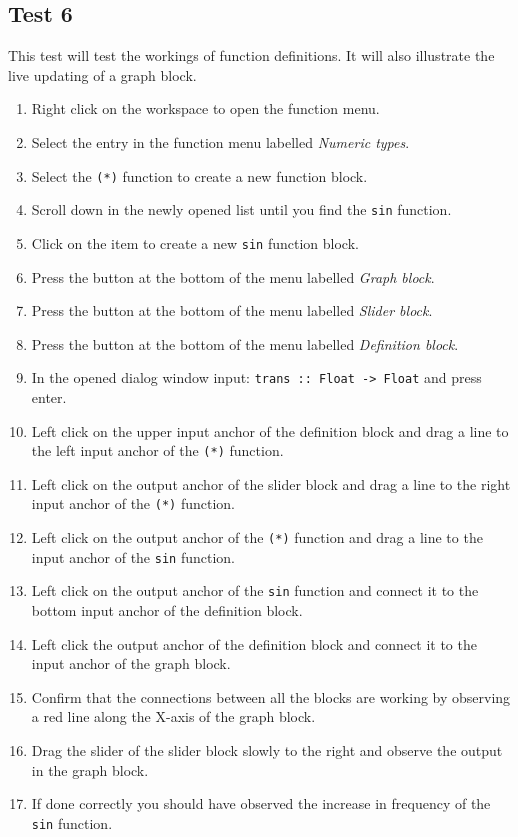 	\subsection{Test 6}
		This test will test the workings of function definitions. It will also illustrate the live updating of a graph block.

		\begin{enumerate}
			\item Right click on the workspace to open the function menu.
			\item Select the entry in the function menu labelled \emph{Numeric types}.
			\item Select the \texttt{(*)} function to create a new function block.
			\item Scroll down in the newly opened list until you find the \texttt{sin} function.
			\item Click on the item to create a new \texttt{sin} function block.
			\item Press the button at the bottom of the menu labelled \emph{Graph block}.
			\item Press the button at the bottom of the menu labelled \emph{Slider block}.
			\item Press the button at the bottom of the menu labelled \emph{Definition block}.
			\item In the opened dialog window input: \texttt{trans :: Float -> Float} and press enter.
			\item Left click on the upper input anchor of the definition block and drag a line to the left input anchor of the \texttt{(*)} function.
			\item Left click on the output anchor of the slider block and drag a line to the right input anchor of the \texttt{(*)} function.
			\item Left click on the output anchor of the \texttt{(*)} function and drag a line to the input anchor of the \texttt{sin} function.
			\item Left click on the output anchor of the \texttt{sin} function and connect it to the bottom input anchor of the definition block.
			\item Left click the output anchor of the definition block and connect it to the input anchor of the graph block.
			\item Confirm that the connections between all the blocks are working by observing a red line along the X-axis of the graph block.
			\item Drag the slider of the slider block slowly to the right and observe the output in the graph block.
			\item If done correctly you should have observed the increase in frequency of the \texttt{sin} function.
		\end{enumerate}

